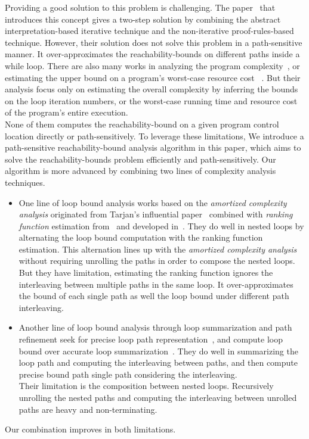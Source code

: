 Providing a good solution to this problem is challenging.
The paper~\cite{GulwaniZ10} that introduces this concept
gives a two-step solution by combining the abstract interpretation-based iterative technique
 and the non-iterative proof-rules-based technique.
 However, their solution
does not solve this problem in a path-sensitive manner.
It over-approximates the reachability-bounds on different paths inside a while loop.
 There are also many works in analyzing the program complexity~\cite{GustafssonEL05, HumenbergerJK18},
 or estimating the upper bound on a program's worst-case resource cost
~\cite{BrockschmidtEFFG16, AlbertAGP08, AliasDFG10, Flores-MontoyaH14}.
But their analysis
focus only on estimating 
the overall complexity 
by inferring the bounds on the loop iteration numbers,
 or the worst-case running time and resource cost of the program's entire execution.
 \\
 None of them computes the reachability-bound on a given program control location directly or path-sensitively.
 To leverage these limitations,
We introduce a path-sensitive reachability-bound analysis algorithm in this paper, which aims to solve 
the reachability-bounds problem efficiently and path-sensitively.
Our algorithm is more advanced by combining two lines of complexity analysis techniques.
 \begin{itemize}
 \item One line of loop bound analysis works based on the \emph{amortized complexity analysis} originated from Tarjan's influential paper~\cite{PotechinP17} combined with \emph{ranking function} estimation from~\cite{BradleyMS05} and developed in~\cite{ZulegerGSV11,SinnZV14,SinnZV17,LuCT21,AliasDFG10}.
 They do well in nested loops by alternating the loop bound computation with the ranking function estimation. This alternation lines up with the \emph{amortized complexity analysis} without requiring unrolling the paths in order to compose the nested loops.
 \\
But they have limitation, estimating the ranking function ignores the interleaving between multiple paths in the same loop.
It over-approximates the bound of each single path as well the loop bound under different path interleaving.
\item 
Another line of loop bound analysis through loop summarization and path refinement seek for precise loop path representation~\cite{ManoliosV06, BalakrishnanSIG09, SharmaDDA11, Flores-MontoyaH14, HumenbergerJK18, CyphertBKR19}, and compute loop bound over accurate loop summarization~\cite{GulwaniJK09, ZulegerGSV11}.
They do well in summarizing the loop path and computing the interleaving between paths, and then compute precise bound path single path considering the interleaving.
\\
Their limitation is the composition between nested loops. Recursively unrolling the nested paths and computing the interleaving between unrolled paths are heavy and non-terminating.
 \end{itemize}
Our combination improves in both limitations.

